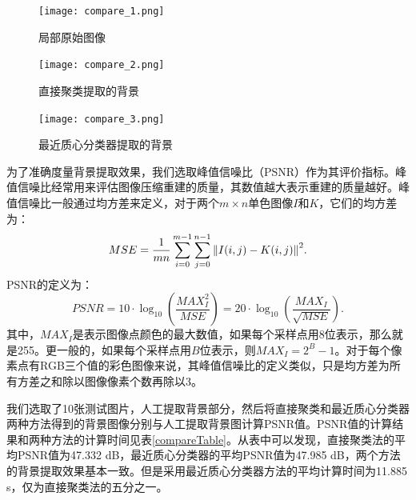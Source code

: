 \documentclass[UTF8,a4paper,twoside]{ctexart}
\begin{document}
\begin{figure}[H]
  \centering
  \begin{minipage}{5cm}
    \centering
    \texttt{[image: compare\_1.png]}
    \caption{局部原始图像}
    \label{compare_1}
  \end{minipage}
  \hspace{0.2cm}%
  \begin{minipage}{5cm}
    \centering
    \texttt{[image: compare\_2.png]}
    \caption{直接聚类提取的背景}
    \label{compare_2}
  \end{minipage}
  \hspace{0.2cm}%
  \begin{minipage}{5cm}
    \centering
    \texttt{[image: compare\_3.png]}
    \caption{最近质心分类器提取的背景}
    \label{compare_3}
  \end{minipage}
\end{figure}

为了准确度量背景提取效果，我们选取峰值信噪比（PSNR）作为其评价指标。峰值信噪比经常用来评估图像压缩重建的质量，其数值越大表示重建的质量越好。峰值信噪比一般通过均方差来定义，对于两个$m\times n$单色图像$I$和$K$，它们的均方差为：
\begin{equation}
  MSE = \frac{1}{mn} \sum_{i=0}^{m-1} \sum_{j=0}^{n-1} \norm{I(i,j) - K(i,j)}^2.
\end{equation}
PSNR的定义为：
\begin{equation}
  PSNR = 10 \cdot \log_{10} \left(\frac{MAX_I^2}{MSE}\right) = 20 \cdot \log_{10}\left(\frac{MAX_I}{\sqrt{MSE}}\right).
\end{equation}
其中，$MAX_I$是表示图像点颜色的最大数值，如果每个采样点用8位表示，那么就是255。更一般的，如果每个采样点用$B$位表示，则$MAX_I = 2^B - 1$。对于每个像素点有RGB三个值的彩色图像来说，其峰值信噪比的定义类似，只是均方差为所有方差之和除以图像像素个数再除以3。

我们选取了10张测试图片，人工提取背景部分，然后将直接聚类和最近质心分类器两种方法得到的背景图像分别与人工提取背景图计算PSNR值。PSNR值的计算结果和两种方法的计算时间见表\ref{compareTable}。从表中可以发现，直接聚类法的平均PSNR值为47.332 dB，最近质心分类器的平均PSNR值为47.985 dB，两个方法的背景提取效果基本一致。但是采用最近质心分类器方法的平均计算时间为11.885 s，仅为直接聚类法的五分之一。
\end{document}
